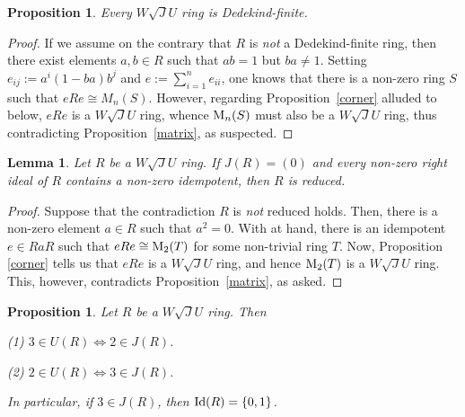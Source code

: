 \documentclass[12pt]{amsart}
\newtheorem{proposition}[theorem]{Proposition} \newtheorem{lemma}[theorem]{Lemma}
\begin{document}
\begin{proposition}\label{dedekind} Every $W\sqrt{J}U$ ring is Dedekind-finite.
\end{proposition}

\begin{proof}
If we assume on the contrary that $R$ is {\it not} a Dedekind-finite ring, then there exist elements $a, b \in
R$ such that $ab = 1$ but $ba \neq 1$. Setting $e_{ij} := a^i(1-ba)b^j$ and $e :=\sum_{i=1}^{n}e_{ii}$, one knows that there is a non-zero ring $S$ such that $eRe \cong M_n(S)$. However, regarding
Proposition~\ref{corner} alluded to below, $eRe$ is a $W\sqrt{J}U$ ring, whence ${\rm M}_n(S)$ must also be a $W\sqrt{J}U$ ring, thus contradicting Proposition~\ref{matrix}, as suspected.
\end{proof}

\begin{lemma}\label{reduced} Let \(R\) be a $W\sqrt{J}U$ ring. If \(J(R) = (0)\) and every non-zero right ideal
of \(R\) contains a non-zero idempotent, then \(R\) is reduced.
\end{lemma}

\begin{proof} Suppose that the contradiction \(R\) is {\it not} reduced holds. Then, there is a non-zero element \(a \in R\) such that \(a^2 =0\). With \cite[Theorem 2.1]{3} at hand, there is an idempotent \(e \in RaR\) such that \(eRe \cong {\rm M}_2(T)\) for some non-trivial ring \(T\). Now, Proposition \ref{corner} tells us that $eRe$ is a $W\sqrt{J}U$ ring, and hence ${\rm M}_2(T)$ is a $W\sqrt{J}U$ ring. This, however, contradicts Proposition~\ref{matrix}, as asked.
\end{proof}

\begin{proposition}\label{memeber} Let \( R \) be a $W\sqrt{J}U$ ring. Then

(1) \( 3 \in U(R) \iff 2 \in J(R) \).

(2) \( 2 \in U(R) \iff 3 \in J(R) \).

In particular, if \(3 \in J(R)\), then \({\rm Id}(R) = \{0, 1\}\).
\end{proposition}
\end{document}
